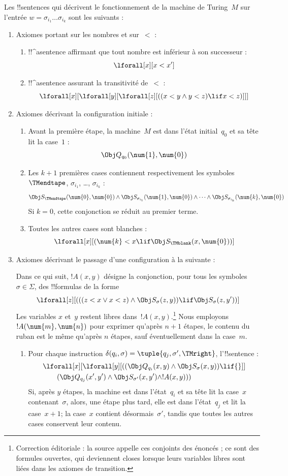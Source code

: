 \documentclass[../../../include/open-logic-section]{subfiles}
\begin{document}
Les !!{sentence}s qui décrivent le fonctionnement de la machine
de Turing~$M$ sur l'entrée $w=\sigma_{i_1}\dots\sigma_{i_k}$
sont les suivants :
\begin{enumerate}
\item Axiomes portant sur les nombres et sur~$<$ :
\begin{enumerate}
\item !!^a{sentence} affirmant que tout nombre est inférieur à son
  successeur :
\[
\lforall[x][x<x']
\]
\item !!^a{sentence} assurant la transitivité de~$<$ :
\[
\lforall[x][\lforall[y][\lforall[z][
  ((x<y\land y<z)\lif x<z)]]]
\]
\end{enumerate}
\item Axiomes décrivant la configuration initiale :
\begin{enumerate}
\item Avant la première étape, la machine~$M$ est dans l'état
  initial~$q_0$ et sa tête lit la case~$1$ :
\[
\Obj Q_{q_0}(\num{1},\num{0})
\]
\item Les $k+1$ premières cases contiennent respectivement les
  symboles $\TMendtape$, $\sigma_{i_1}$, \dots,
  $\sigma_{i_k}$ :
\[
\Obj S_\TMendtape(\num{0},\num{0})\land
\Obj S_{\sigma_{i_1}}(\num{1},\num{0})\land
\dots\land
\Obj S_{\sigma_{i_k}}(\num{k},\num{0})
\]
  Si $k=0$, cette conjonction se réduit au premier terme.
\item Toutes les autres cases sont blanches :
\[
\lforall[x][(\num{k}<x\lif\Obj S_\TMblank(x,\num{0}))]
\]
\end{enumerate}
\item Axiomes décrivant le passage d'une configuration à la
  suivante :

Dans ce qui suit, $!A(x,y)$ désigne la conjonction, pour tous les
symboles $\sigma\in\Sigma$, des !!{formula}s de la forme
\[
\lforall[z][
  (((z<x\lor x<z)\land\Obj S_\sigma(z,y))
  \lif\Obj S_\sigma(z,y'))]
\]
Les variables $x$ et~$y$ restent libres dans~$!A(x,y)$.\footnote{Correction éditoriale : la source appelle ces conjoints des énoncés ; ce sont des formules ouvertes, qui deviennent closes lorsque leurs variables libres sont liées dans les axiomes de transition.}
Nous employons $!A(\num{m},\num{n})$ pour exprimer qu'après $n+1$
étapes, le contenu du ruban est le même qu'après $n$ étapes,
sauf éventuellement dans la case~$m$.
\begin{enumerate}
\item {} Pour chaque instruction
  $\delta(q_i,\sigma)=\tuple{q_j,\sigma',\TMright}$,
  l'!!{sentence} :
\begin{align*}
& \lforall[x][\lforall[y][(
  (\Obj Q_{q_i}(x,y)\land\Obj S_\sigma(x,y))\lif {}]]\\
&\qquad (\Obj Q_{q_j}(x',y')\land\Obj S_{\sigma'}(x,y')
  \land !A(x,y)))
\end{align*}
Si, après $y$ étapes, la machine est dans l'état~$q_i$ et sa tête
lit la case~$x$ contenant~$\sigma$, alors, une étape plus tard,
elle est dans l'état~$q_j$ et lit la case~$x+1$; la case~$x$
contient désormais~$\sigma'$, tandis que toutes les autres cases
conservent leur contenu.


\end{enumerate}
\end{enumerate}
\end{document}
